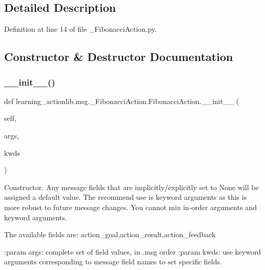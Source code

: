 \subsection{Detailed Description}


Definition at line 14 of file \+\_\+\+Fibonacci\+Action.\+py.



\subsection{Constructor \& Destructor Documentation}
\mbox{\label{classlearning__actionlib_1_1msg_1_1__FibonacciAction_1_1FibonacciAction_adb8e65b771f86e63a3acc2d328e6d1a4}} 
\subsubsection{\texorpdfstring{\+\_\+\+\_\+init\+\_\+\+\_\+()}{\_\_init\_\_()}}
{\footnotesize\ttfamily def learning\+\_\+actionlib.\+msg.\+\_\+\+Fibonacci\+Action.\+Fibonacci\+Action.\+\_\+\+\_\+init\+\_\+\+\_\+ (\begin{DoxyParamCaption}\item[{}]{self,  }\item[{}]{args,  }\item[{}]{kwds }\end{DoxyParamCaption})}

\begin{DoxyVerb}Constructor. Any message fields that are implicitly/explicitly
set to None will be assigned a default value. The recommend
use is keyword arguments as this is more robust to future message
changes.  You cannot mix in-order arguments and keyword arguments.

The available fields are:
   action_goal,action_result,action_feedback

:param args: complete set of field values, in .msg order
:param kwds: use keyword arguments corresponding to message field names
to set specific fields.
\end{DoxyVerb}
 

